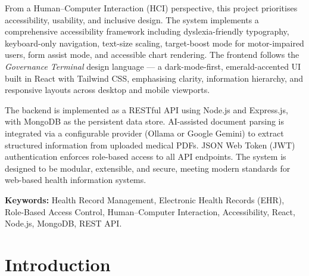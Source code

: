 \documentclass[12pt,a4paper]{report}
\begin{document}
From a Human--Computer Interaction (HCI) perspective, this project prioritises accessibility, usability, and inclusive design. The system implements a comprehensive accessibility framework including dyslexia-friendly typography, keyboard-only navigation, text-size scaling, target-boost mode for motor-impaired users, form assist mode, and accessible chart rendering. The frontend follows the \textit{Governance Terminal} design language — a dark-mode-first, emerald-accented UI built in React with Tailwind CSS, emphasising clarity, information hierarchy, and responsive layouts across desktop and mobile viewports.

The backend is implemented as a RESTful API using Node.js and Express.js, with MongoDB as the persistent data store. AI-assisted document parsing is integrated via a configurable provider (Ollama or Google Gemini) to extract structured information from uploaded medical PDFs. JSON Web Token (JWT) authentication enforces role-based access to all API endpoints. The system is designed to be modular, extensible, and secure, meeting modern standards for web-based health information systems.

\textbf{Keywords:} Health Record Management, Electronic Health Records (EHR), Role-Based Access Control, Human--Computer Interaction, Accessibility, React, Node.js, MongoDB, REST API.

\tableofcontents

\listoffigures

\listoftables

\setcounter{page}{1}

\chapter{Introduction}
\end{document}
